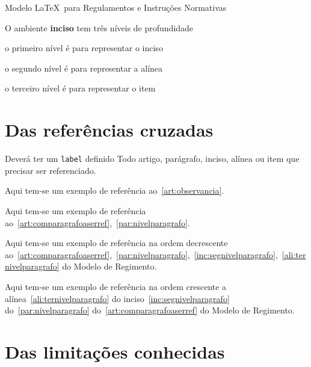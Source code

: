 \documentclass[11pt,twoside,a4paper]{inifsc}
\begin{document}
\begin{normativa}{Modelo \LaTeX~para Regulamentos e Instruções Normativas}
\begin{artigo}
    \item O ambiente \textbf{inciso} tem três níveis de profundidade
    \begin{inciso}
        \item o primeiro nível é para representar o inciso
        \begin{inciso}
            \item o segundo nível é para representar a alínea
            \begin{inciso}
                \item o terceiro nível é para representar o item
            \end{inciso}
        \end{inciso}
    \end{inciso}
\end{artigo}


\section{Das referências cruzadas}

\begin{artigo}
    \item Deverá ter um \texttt{label} definido Todo artigo, parágrafo, inciso, alínea ou item que precisar ser referenciado.
    \begin{paragrafo}
        \item Aqui tem-se um exemplo de referência ao~\ref{art:observancia}.
        \item Aqui tem-se um exemplo de referência ao~\ref{art:comparagrafoaserref},~\ref{par:nivelparagrafo}.
        \item Aqui tem-se um exemplo de referência na ordem decrescente ao~\ref{art:comparagrafoaserref},~\ref{par:nivelparagrafo},~\ref{inc:segnivelparagrafo},~\ref{ali:ternivelparagrafo} do Modelo de Regimento.
        \begin{paragrafo}
            \item Aqui tem-se um exemplo de referência na ordem crescente a alínea~\ref{ali:ternivelparagrafo} do inciso~\ref{inc:segnivelparagrafo} do~\ref{par:nivelparagrafo} do~\ref{art:comparagrafoaserref} do Modelo de Regimento.    
        \end{paragrafo}
    \end{paragrafo}
\end{artigo}


\section{Das limitações conhecidas}


\end{normativa}
\end{document}
